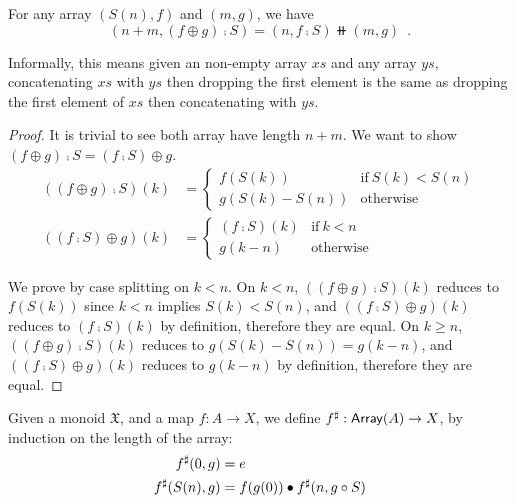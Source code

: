 \begin{lemmarep}\label{array:split}
    For any array $(S(n), f)$ and $(m, g)$, we have
    \[
        (n + m, (f \oplus g) \comp S) = (n, f \comp S) \doubleplus (m, g)
        \enspace .
    \]
\end{lemmarep}

Informally, this means given an non-empty array $xs$ and any array $ys$,
concatenating $xs$ with $ys$ then dropping the first element is the same as
dropping the first element of $xs$ then concatenating with $ys$.

\begin{proof}
    It is trivial to see both array have length $n + m$. We want to show $(f \oplus g) \comp S = (f \comp S) \oplus g$.
    \begin{align*}
        ((f \oplus g) \comp S)(k) & = \begin{cases}
                                          f(S(k))        & \text{if}\ S(k) < S(n) \\
                                          g(S(k) - S(n)) & \text{otherwise}
                                      \end{cases} \\
        ((f \comp S) \oplus g)(k) & = \begin{cases}
                                          (f \comp S)(k) & \text{if}\ k < n \\
                                          g(k - n)       & \text{otherwise}
                                      \end{cases}
    \end{align*}

    We prove by case splitting on $k < n$.
    On $k < n$, $((f \oplus g) \comp S)(k)$ reduces to $f(S(k))$ since $k < n$ implies $S(k) < S(n)$,
    and $((f \comp S) \oplus g)(k)$ reduces to $(f \comp S)(k)$ by definition, therefore they are equal.
    On $k \geq n$, $((f \oplus g) \comp S)(k)$ reduces to $g(S(k) - S(n)) = g(k - n)$,
    and $((f \comp S) \oplus g)(k)$ reduces to $g(k - n)$ by definition, therefore they are equal.
\end{proof}

\begin{definition}
    Given a monoid $\mathfrak{X}$, and a map $f : A \to X$,
    we define ${f}^{\sharp} : \operatorname{\mathsf{Array}}(A) \to X$, by induction on the length of the array:
    \begin{align*}
        {f}^{\sharp}(0 , g)    & = e                                    \\
        {f}^{\sharp}(S(n) , g) & = f(g(0)) \mathbin{\bullet} {f}^{\sharp}(n , g \circ S)
    \end{align*}
\end{definition}

